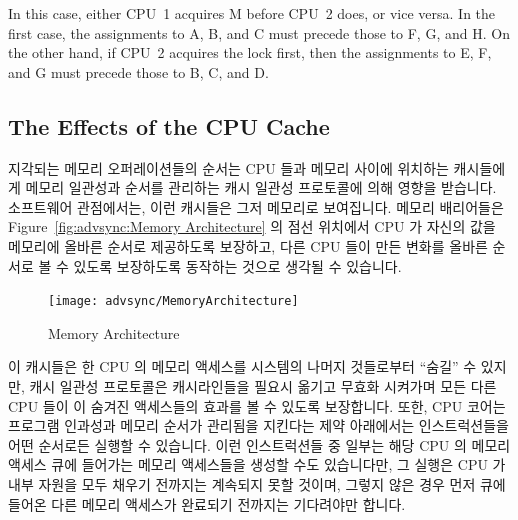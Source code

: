 \begin{enumerate}
In this case, either CPU~1 acquires M before CPU~2 does, or vice versa.
In the first case, the assignments to A, B, and C must precede
those to F, G, and H.
On the other hand, if CPU~2 acquires the lock first, then the
assignments to E, F, and G must precede those to B, C, and D.
\fi

\subsection{The Effects of the CPU Cache}
\label{sec:advsync:The Effects of the CPU Cache}

지각되는 메모리 오퍼레이션들의 순서는 CPU 들과 메모리 사이에 위치하는
캐시들에게 메모리 일관성과 순서를 관리하는 캐시 일관성 프로토콜에 의해 영향을
받습니다.
소프트웨어 관점에서는, 이런 캐시들은 그저 메모리로 보여집니다.
메모리 배리어들은 Figure~\ref{fig:advsync:Memory Architecture} 의 점선 위치에서
CPU 가 자신의 값을 메모리에 올바른 순서로 제공하도록 보장하고, 다른 CPU 들이
만든 변화를 올바른 순서로 볼 수 있도록 보장하도록 동작하는 것으로 생각될 수
있습니다.

\begin{figure}[htb]
\centering
\texttt{[image: advsync/MemoryArchitecture]}
\caption{Memory Architecture}
\end{figure}

이 캐시들은 한 CPU 의 메모리 액세스를 시스템의 나머지 것들로부터 ``숨길'' 수
있지만, 캐시 일관성 프로토콜은 캐시라인들을 필요시 옮기고 무효화 시켜가며 모든
다른 CPU 들이 이 숨겨진 액세스들의 효과를 볼 수 있도록 보장합니다.
또한, CPU 코어는 프로그램 인과성과 메모리 순서가 관리됨을 지킨다는 제약
아래에서는 인스트럭션들을 어떤 순서로든 실행할 수 있습니다.
이런 인스트럭션들 중 일부는 해당 CPU 의 메모리 액세스 큐에 들어가는 메모리
액세스들을 생성할 수도 있습니다만, 그 실행은 CPU 가 내부 자원을 모두 채우기
전까지는 계속되지 못할 것이며, 그렇지 않은 경우 먼저 큐에 들어온 다른 메모리
액세스가 완료되기 전까지는 기다려야만 합니다.
\iffalse


\end{enumerate}

